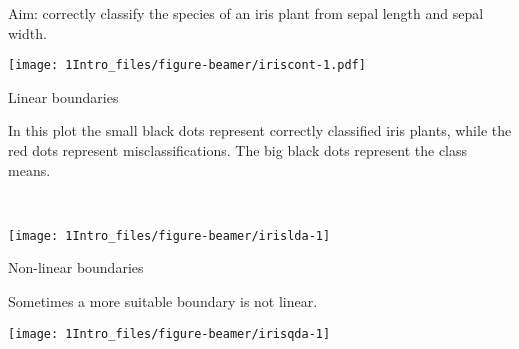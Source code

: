 \documentclass[10pt,ignorenonframetext,]{beamer}
\begin{document}
\begin{frame}

Aim: correctly classify the species of an iris plant from sepal length
and sepal width.

\texttt{[image: 1Intro\_files/figure-beamer/iriscont-1.pdf]}

\end{frame}

\begin{frame}

\begin{block}{Linear boundaries}

\vspace{2mm}

In this plot the small black dots represent correctly classified iris
plants, while the red dots represent misclassifications. The big black
dots represent the class means.

~

\texttt{[image: 1Intro\_files/figure-beamer/irislda-1]}

\end{block}

\end{frame}

\begin{frame}

\begin{block}{Non-linear boundaries}

\vspace{2mm}

Sometimes a more suitable boundary is not linear.\\
\hspace*{0.333em}

\texttt{[image: 1Intro\_files/figure-beamer/irisqda-1]}

\end{block}

\end{frame}
\end{document}
